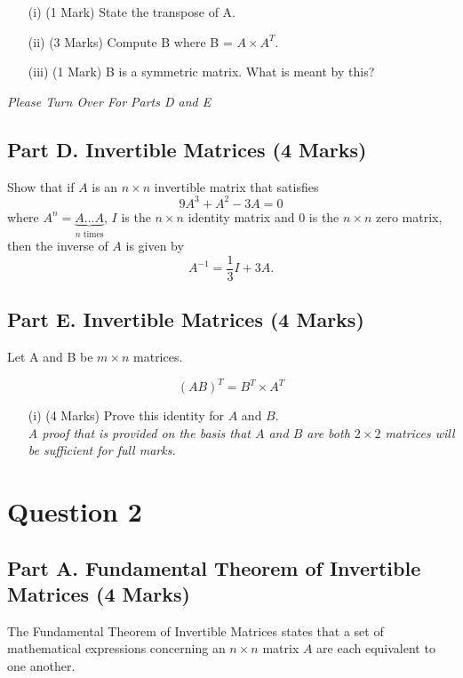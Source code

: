 \documentclass[a4paper,12pt]{article}
\begin{document}
		\begin{itemize}
			\item[(i)] (1 Mark) State the transpose of A.
			\item[(ii)] (3 Marks) Compute B where B = $ A \times A^{T}$. 
			\item[(iii)] (1 Mark) B is a symmetric matrix. What is meant by this?
		\end{itemize}
		\noindent 	\textit{Please Turn Over For Parts D and E}
	\newpage
			\subsection*{Part D. Invertible Matrices (4 Marks)}	
	\noindent	Show that if $A$ is an $n\times n$ invertible matrix that satisfies 
	$$
	9A^3+A^2-3A=0
	$$
	where $A^n=\underbrace{A\ldots A}_{\textrm{$n$ times}}$, %
	$I$ is the $n\times n$  identity matrix and $0$ is the $n\times n$  zero matrix,
	then the inverse of $A$ is given by  %
	$$
	A^{-1}=\frac13I+3A.
	$$
		\smallskip
		\subsection*{Part E. Invertible Matrices (4 Marks)}	
Let A and B be $m \times n$ matrices. 
	
\[	(AB)^{T} = B^T \times A^T\]

\begin{itemize}
\item[(i)] (4 Marks) Prove this identity for $A$ and $B$.\\ \smallskip \textit{A proof that is provided on the basis that $A$ and $B$ are both $2 \times 2$ matrices will be sufficient for full marks.}
\end{itemize}
\newpage
\section*{Question 2}
	\subsection*{Part A. Fundamental Theorem of Invertible Matrices  (4 Marks)}
	The Fundamental Theorem of Invertible Matrices states that a set of mathematical expressions concerning an $n\times n$ matrix $A$ are each equivalent to one another.
	
\end{document}
